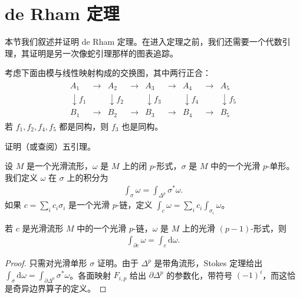 \documentclass[../../main.tex]{subfiles}
\begin{document}
\section{de Rham 定理}\label{section:ch18-the-de-rham-theorem}

本节我们叙述并证明 de Rham 定理。在进入定理之前，我们还需要一个代数引理，其证明是另一次像蛇引理那样的图表追踪。

\begin{lemma}[五引理]\label{lemma:ch18-five-lemma}
考虑下面由模与线性映射构成的交换图，其中两行正合：
\begin{align*}
\begin{array}{ccccccccc}
A_1&\to&A_2&\to&A_3&\to&A_4&\to&A_5\\
\downarrow f_1&&\downarrow f_2&&\downarrow f_3&&\downarrow f_4&&\downarrow f_5\\
B_1&\to&B_2&\to&B_3&\to&B_4&\to&B_5
\end{array}
\end{align*}
若 $f_1,f_2,f_4,f_5$ 都是同构，则 $f_3$ 也是同构。
\end{lemma}

\begin{exercise}\label{exercise:ch18-11}
证明（或查阅）五引理。
\end{exercise}

设 $M$ 是一个光滑流形，$\omega$ 是 $M$ 上的闭 $p$-形式，$\sigma$ 是 $M$ 中的一个光滑 $p$-单形。我们定义 $\omega$ 在 $\sigma$ 上的积分为
\begin{align*}
\int_\sigma\omega=\int_{\Delta^p}\sigma^*\omega.
\end{align*}
如果 $c=\sum_i c_i\sigma_i$ 是一个光滑 $p$-链，定义 $\int_c\omega=\sum_i c_i\int_{\sigma_i}\omega$。

\begin{theorem}\label{theorem:ch18-stokes-for-chains}
若 $c$ 是光滑流形 $M$ 中的一个光滑 $p$-链，$\omega$ 是 $M$ 上的光滑 $(p-1)$-形式，则
\begin{align}
\int_{\partial c}\omega=\int_c\mathrm{d}\omega.
\end{align}
\end{theorem}

\begin{proof}
只需对光滑单形 $\sigma$ 证明。由于 $\Delta^p$ 是带角流形，Stokes 定理给出 $\int_\sigma\mathrm{d}\omega=\int_{\partial\Delta^p}\sigma^*\omega$。各面映射 $F_{i,p}$ 给出 $\partial\Delta^p$ 的参数化，带符号 $(-1)^i$，而这恰是奇异边界算子的定义。
\end{proof}
\end{document}
